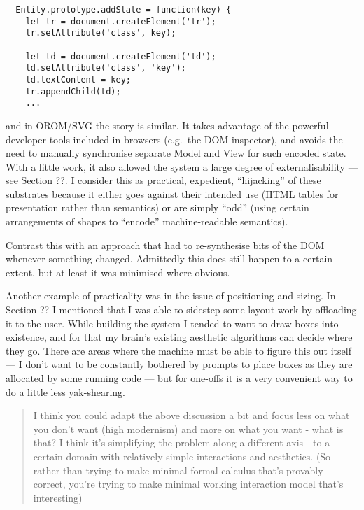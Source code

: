 \documentclass[english,submission]{programming}
\begin{document}
  \begin{verbatim}
  Entity.prototype.addState = function(key) {
    let tr = document.createElement('tr');
    tr.setAttribute('class', key);

    let td = document.createElement('td');
    td.setAttribute('class', 'key');
    td.textContent = key;
    tr.appendChild(td);
    ...
  \end{verbatim}

  and in OROM/SVG the story is similar. It takes advantage of the powerful
  developer tools included in browsers (e.g.~the DOM inspector), and
  avoids the need to manually synchronise separate Model and View for such
  encoded state. With a little work, it also allowed the system a large
  degree of externalisability --- see Section ??. I consider this as
  practical, expedient, ``hijacking'' of these substrates because it
  either goes against their intended use (HTML tables for presentation
  rather than semantics) or are simply ``odd'' (using certain arrangements
  of shapes to ``encode'' machine-readable semantics).

  Contrast this with an approach that had to re-synthesise bits of the DOM
  whenever something changed. Admittedly this does still happen to a
  certain extent, but at least it was minimised where obvious.

  Another example of practicality was in the issue of positioning and
  sizing. In Section ?? I mentioned that I was able to sidestep some
  layout work by offloading it to the user. While building the system I
  tended to want to draw boxes into existence, and for that my brain's
  existing aesthetic algorithms can decide where they go. There are areas
  where the machine must be able to figure this out itself --- I don't
  want to be constantly bothered by prompts to place boxes as they are
  allocated by some running code --- but for one-offs it is a very
  convenient way to do a little less yak-shearing.

  \begin{quote}
  I think you could adapt the above discussion a bit and focus less on
  what you don't want (high modernism) and more on what you want - what is
  that? I think it's simplifying the problem along a different axis - to a
  certain domain with relatively simple interactions and aesthetics. (So
  rather than trying to make minimal formal calculus that's provably
  correct, you're trying to make minimal working interaction model that's
  interesting)
  \end{quote}
\end{document}
